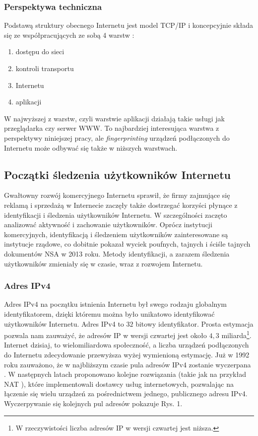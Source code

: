 \subsubsection{Perspektywa techniczna}
Podstawą struktury obecnego Internetu jest model TCP/IP i koncepcyjnie składa
się ze współpracujących ze sobą 4 warstw \cite{kahn1974protocol}:
\begin{enumerate}
	\item dostępu do sieci
	\item kontroli transportu
	\item Internetu
	\item aplikacji
\end{enumerate}
W najwyższej z warstw, czyli warstwie aplikacji działają takie usługi jak
przeglądarka czy serwer WWW. To najbardziej interesująca warstwa z perspektywy
niniejszej pracy, ale \emph{fingerprinting} urządzeń podłączonych do Internetu
może odbywać się także w niższych warstwach. %

\subsection{Początki śledzenia użytkowników Internetu}
Gwałtowny rozwój komercyjnego Internetu sprawił, że firmy zajmujące się reklamą
i sprzedażą w Internecie zaczęły także dostrzegać korzyści płynące z
identyfikacji i śledzenia użytkowników Internetu. W szczególności zaczęto
analizować aktywność i zachowanie użytkowników. Oprócz instytucji komercyjnych,
identyfikacją i śledzeniem użytkowników zainteresowane są instytucje rządowe, co
dobitnie pokazał wyciek poufnych, tajnych i ściśle tajnych dokumentów NSA w 2013
roku. Metody identyfikacji, a zarazem śledzenia użytkowników zmieniały się w
czasie, wraz z rozwojem Internetu.

\subsubsection{Adres IPv4}
Adres IPv4 na początku istnienia Internetu był swego rodzaju globalnym
identyfikatorem, dzięki któremu można było unikatowo identyfikować użytkowników
Internetu. Adres IPv4 to \(32\) bitowy identyfikator. Prosta estymacja pozwala
nam zauważyć, że adresów IP w wersji czwartej jest około \(4,3\)
miliarda\footnote{W rzeczywistości liczba adresów IP w wersji czwartej jest
niższa.}. Internet dzisiaj, to wielomiliardowa społeczność, a liczba urządzeń
podłączonych do Internetu zdecydowanie przewyższa wyżej wymienioną estymację.
Już w 1992 roku zauważono, że w najbliższym czasie pula adresów IPv4 zostanie
wyczerpana \cite{fuller1992supernetting}. W następnych latach proponowano
kolejne rozwiązania (takie jak na przykład NAT \cite{egevang1994ip}), które
implementowali dostawcy usług internetowych, pozwalając na łączenie się wielu
urządzeń za pośrednictwem jednego, publicznego adresu IPv4. Wyczerpywanie się
kolejnych pul adresów pokazuje Rys. 1.

